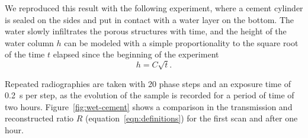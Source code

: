 We reproduced this result with the following experiment, where a cement
cylinder is sealed on the sides and put in contact with a water layer on the
bottom. The water slowly infiltrates the porous structures with time, and
the height of the water column $h$ can be modeled with a simple
proportionality to the square root of the time $t$ elapsed since the beginning
of the experiment
\begin{equation}
    h = C\sqrt{t}.
    \label{eq:sorptivity}
\end{equation}

Repeated radiographies are taken with \num{20} phase steps and an exposure
time of \SI{0.2}{\second} per step, as the evolution of the sample is
recorded for a period of time of two hours. Figure~\ref{fig:wet-cement}
shows a comparison in the transmission and reconstructed ratio $R$
(equation~\ref{eqn:definitions}) for the first scan and after one hour.

